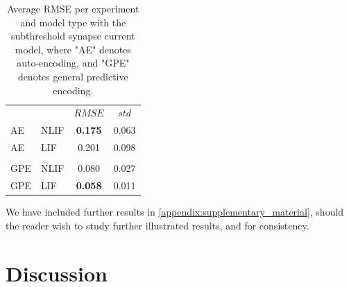 \documentclass[mphil,deptreport,ianc]{infthesis} %
\begin{document}
\begin{table}
\caption{Average RMSE per experiment and model type with the subthreshold synapse current model, where "AE" denotes auto-encoding, and "GPE" denotes general predictive encoding.}
\label{tab:RMSE_per_exp_gating}
\begin{center}
\begin{tabular}{ l l c c }
 & & $RMSE$ & $std$ \\
AE & NLIF & \textbf{0.175} & 0.063 \\ 
AE & LIF & 0.201 & 0.098 \\  
 \\
GPE & NLIF & 0.080 & 0.027 \\ 
GPE & LIF & \textbf{0.058} & 0.011 \\  
\end{tabular}
\end{center}
\end{table}

We have included further results in \ref{appendix:supplementary_material}, should the reader wish to study further illustrated results, and for consistency.


\section{Discussion}
\end{document}
